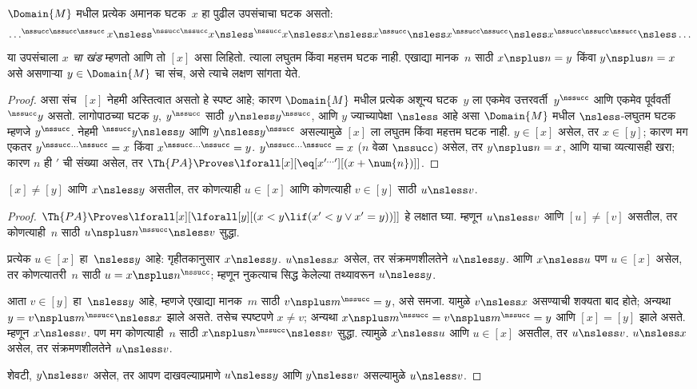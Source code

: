 \begin{prop}
$\Domain{M}$ मधील प्रत्येक अमानक घटक~$x$ हा पुढील उपसंचाचा घटक
असतो:
\[\dots ^{\nssucc\nssucc\nssucc}x \nsless ^{\nssucc\nssucc}x \nsless
^{\nssucc}x \nsless x \nsless x^{\nssucc} \nsless x^{\nssucc\nssucc}
\nsless x^{\nssucc\nssucc\nssucc} \nsless \dots
\]
या उपसंचाला \emph{$x$ चा खंड} म्हणतो आणि तो $[x]$ असा लिहितो. त्याला
लघुतम किंवा महत्तम घटक नाही. एखाद्या मानक~$n$ साठी
$x \nsplus n = y$ किंवा $y \nsplus n = x$ असे असणाऱ्या
$y \in \Domain{M}$ चा संच, असे त्याचे लक्षण सांगता येते.
\end{prop}

\begin{proof}
असा संच~$[x]$ नेहमी अस्तित्वात असतो हे स्पष्ट आहे; कारण
$\Domain{M}$ मधील प्रत्येक अशून्य घटक~$y$ ला एकमेव
उत्तरवर्ती~$y^\nssucc$ आणि एकमेव पूर्ववर्ती~$^\nssucc y$ असतो. लागोपाठच्या
घटक $y$, $y^\nssucc$ साठी $y \nsless y^\nssucc$, आणि
$y$ ज्याच्यापेक्षा $\nsless$ आहे असा $\Domain{M}$ मधील $\nsless$-लघुतम
घटक म्हणजे $y^\nssucc$. नेहमी $^\nssucc y \nsless y$ आणि
$y \nsless y^\nssucc$ असल्यामुळे $[x]$ ला लघुतम किंवा महत्तम घटक
नाही. $y \in [x]$ असेल, तर $x \in [y]$; कारण मग एकतर
$y^{\nssucc\dots\nssucc} = x$ किंवा $x^{\nssucc\dots\nssucc} = y$.
$y^{\nssucc\dots\nssucc} = x$ ($n$ वेळा $\nssucc$) असेल, तर
$y \nsplus n = x$, आणि याचा व्यत्यासही खरा; कारण $n$ ही $\prime$ ची
संख्या असेल, तर $\Th{PA} \Proves
\lforall[x][\eq[x^{\prime\dots\prime}][(x + \num{n})]]$.
\end{proof}

\begin{prop}
$[x] \neq [y]$ आणि $x \nsless y$ असतील, तर कोणत्याही $u \in [x]$ आणि
कोणत्याही $v \in [y]$ साठी $u \nsless v$.
\end{prop}

\begin{proof}
$\Th{PA} \Proves \lforall[x][\lforall[y][(x < y \lif (x' < y
    \lor x' = y))]]$ हे लक्षात घ्या. म्हणून $u \nsless v$ आणि
$[u] \neq [v]$ असतील, तर कोणत्याही~$n$ साठी
$u \nsplus n^\nssucc \nsless v$ सुद्धा.

प्रत्येक $u \in [x]$ हा~$\nsless y$ आहे: गृहीतकानुसार
$x \nsless y$. $u \nsless x$ असेल, तर संक्रमणशीलतेने $u \nsless y$.
आणि $x \nsless u$ पण $u \in [x]$ असेल, तर कोणत्यातरी~$n$ साठी
$u = x\nsplus n^\nssucc$; म्हणून नुकत्याच सिद्ध केलेल्या तथ्यावरून
$u \nsless y$.

आता $v \in [y]$ हा~$\nsless y$ आहे, म्हणजे एखाद्या मानक~$m$
साठी $v \nsplus m^\nssucc = y$, असे समजा. यामुळे $v \nsless x$ असण्याची
शक्यता बाद होते; अन्यथा $y = v \nsplus m^\nssucc \nsless x$ झाले असते.
तसेच स्पष्टपणे $x \neq v$; अन्यथा
$x \nsplus m^\nssucc = v \nsplus m^\nssucc = y$ आणि $[x] = [y]$ झाले
असते. म्हणून $x \nsless v$. पण मग कोणत्याही~$n$ साठी
$x \nsplus n^\nssucc \nsless v$ सुद्धा. त्यामुळे $x \nsless u$ आणि
$u \in [x]$ असतील, तर $u \nsless v$. $u \nsless x$ असेल, तर
संक्रमणशीलतेने $u \nsless v$.

शेवटी, $y \nsless v$ असेल, तर आपण दाखवल्याप्रमाणे $u \nsless y$ आणि
$y \nsless v$ असल्यामुळे $u \nsless v$.
\end{proof}

